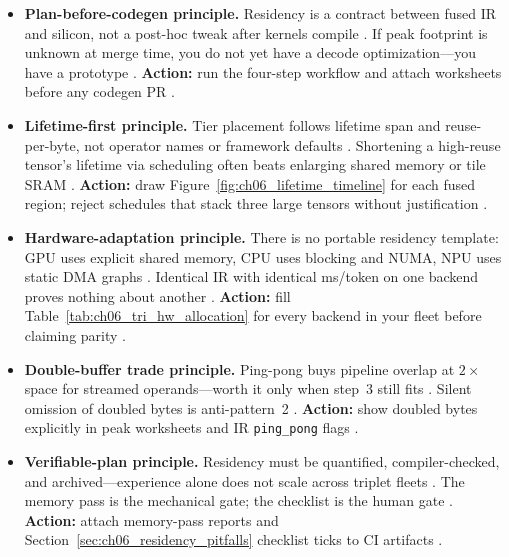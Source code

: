 \begin{itemize}
\item \textbf{Plan-before-codegen principle.}
Residency is a contract between fused IR and silicon, not a post-hoc tweak after kernels compile \citep{dlbook,yirage2026}.
If peak footprint is unknown at merge time, you do not yet have a decode optimization---you have a prototype \citep{memoryfloor2026,taxbreak2026}.
\textbf{Action:} run the four-step workflow and attach worksheets before any codegen PR \citep{chen2020compilerbasedhardw,rotem2018glow}.

\item \textbf{Lifetime-first principle.}
Tier placement follows lifetime span and reuse-per-byte, not operator names or framework defaults \citep{dao2022flashattention,wu2024mirage}.
Shortening a high-reuse tensor's lifetime via scheduling often beats enlarging shared memory or tile SRAM \citep{taxbreak2026,patel2025llminference}.
\textbf{Action:} draw Figure~\ref{fig:ch06_lifetime_timeline} for each fused region; reject schedules that stack three large tensors without justification \citep{yirage2026,dlbook}.

\item \textbf{Hardware-adaptation principle.}
There is no portable residency template: GPU uses explicit shared memory, CPU uses blocking and NUMA, NPU uses static DMA graphs \citep{patel2025llminference,amd2024xdna,nvidia2022hopper}.
Identical IR with identical ms/token on one backend proves nothing about another \citep{yirage2026,chen2020compilerbasedhardw,memoryfloor2026}.
\textbf{Action:} fill Table~\ref{tab:ch06_tri_hw_allocation} for every backend in your fleet before claiming parity \citep{amd2024aie,taxbreak2026}.

\item \textbf{Double-buffer trade principle.}
Ping-pong buys pipeline overlap at $2\times$ space for streamed operands---worth it only when step~3 still fits \citep{semianalysis2024tma,dao2022flashattention}.
Silent omission of doubled bytes is anti-pattern~2 \citep{yirage2026,memoryfloor2026}.
\textbf{Action:} show doubled bytes explicitly in peak worksheets and IR \texttt{ping\_pong} flags \citep{rotem2018glow,chen2020compilerbasedhardw}.

\item \textbf{Verifiable-plan principle.}
Residency must be quantified, compiler-checked, and archived---experience alone does not scale across triplet fleets \citep{yirage2026,wu2024mirage,patel2025llminference}.
The memory pass is the mechanical gate; the checklist is the human gate \citep{chen2020compilerbasedhardw,mpk2025}.
\textbf{Action:} attach memory-pass reports and Section~\ref{sec:ch06_residency_pitfalls} checklist ticks to CI artifacts \citep{yirage2026,taxbreak2026}.
\end{itemize}

